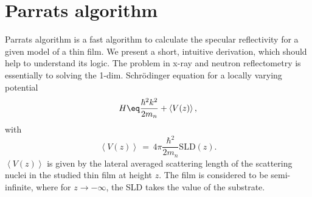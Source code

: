 \documentclass[\main/dresen_thesis.tex]{subfiles}
\begin{document}
\section{Parrats algorithm}\label{ch:appendix:numericalMethods:parrat}
Parrats algorithm is a fast algorithm to calculate the specular reflectivity for a given model of a thin film.
We present a short, intuitive derivation, which should help to understand its logic. The problem in x-ray and neutron reflectometry is essentially to solving the 1-dim.
Schr\"odinger equation for a locally varying potential
\begin{equation}
H \eq \frac{\hbar^2 k^2}{2m_n} + \left<V(z)\right>,
\end{equation}
with
\begin{equation}
\left<V(z)\right> \, = \, 4\pi \frac{\hbar^2}{2 m_n} \mathrm{SLD}(z).
\end{equation}
$\left<V(z)\right> $ is given by the lateral averaged scattering length of the scattering nuclei in the studied thin film at height $z$. The film is considered to be semi-infinite, where for $z \rightarrow -\infty$, the SLD takes the value of the substrate. 
\end{document}
